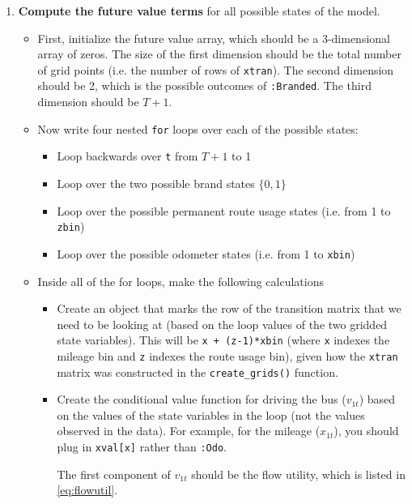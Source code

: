 \documentclass[12pt,english]{article}
\begin{document}
\begin{enumerate}
\begin{enumerate}
        \item \textbf{Compute the future value terms} for all possible states of the model. 
        \begin{itemize}
            \item First, initialize the future value array, which should be a 3-dimensional array of zeros. The size of the first dimension should be the total number of grid points (i.e. the number of rows of \texttt{xtran}). The second dimension should be 2, which is the possible outcomes of \texttt{:Branded}. The third dimension should be $T+1$.
            \item Now write four nested \texttt{for} loops over each of the possible states:
            \begin{itemize}
                \item Loop backwards over \texttt{t} from $T+1$ to 1
                \item Loop over the two possible brand states $\{0,1\}$
                \item Loop over the possible permanent route usage states (i.e. from 1 to \texttt{zbin})
                \item Loop over the possible odometer states (i.e. from 1 to \texttt{xbin})
            \end{itemize}
            \item Inside all of the for loops, make the following calculations
            \begin{itemize}
                \item Create an object that marks the row of the transition matrix that we need to be looking at (based on the loop values of the two gridded state variables). This will be \texttt{x + (z-1)*xbin} (where \texttt{x} indexes the mileage bin and \texttt{z} indexes the route usage bin), given how the \texttt{xtran} matrix was constructed in the \texttt{create\_grids()} function.
                \item Create the conditional value function for driving the bus ($v_{1t}$) based on the values of the state variables in the loop (not the values observed in the data). For example, for the mileage ($x_{1t}$), you should plug in \texttt{xval[x]} rather than \texttt{:Odo}.
                
                \medskip
                
                The first component of $v_{1t}$ should be the flow utility, which is listed in \eqref{eq:flowutil}.
                

\end{itemize}
\end{itemize}
\end{enumerate}
\end{enumerate}
\end{document}

